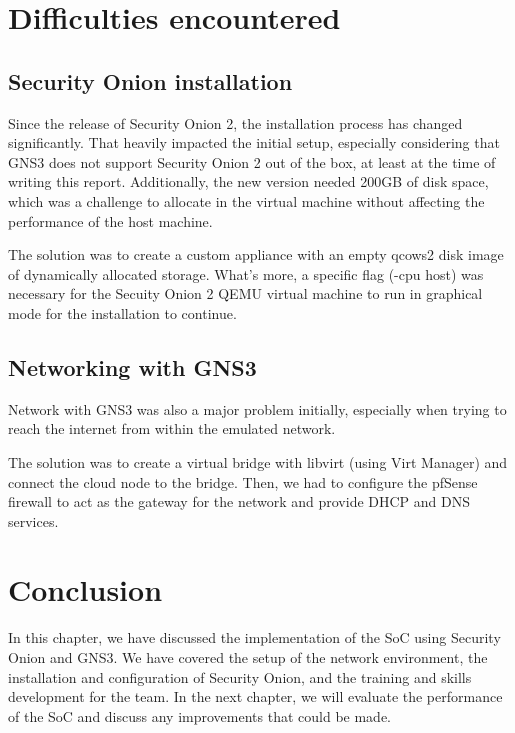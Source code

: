\section{Difficulties encountered}
\subsection{Security Onion installation}
Since the release of Security Onion 2, the installation process has changed significantly.
That heavily impacted the initial setup, especially considering that GNS3 does not support Security Onion 2 out of the box, at least at the time of writing this report.
Additionally, the new version needed 200GB of disk space, which was a challenge to allocate in the virtual machine without affecting the performance of the host machine.

The solution was to create a custom appliance with an empty qcows2 disk image of dynamically allocated storage.
What's more, a specific flag (-cpu host) was necessary for the Secuity Onion 2 QEMU virtual machine to run in graphical mode for the installation to continue.

\subsection{Networking with GNS3}
Network with GNS3 was also a major problem initially, especially when trying to reach the internet from within the emulated network.

The solution was to create a virtual bridge with libvirt (using Virt Manager) and connect the cloud node to the bridge.
Then, we had to configure the pfSense firewall to act as the gateway for the network and provide DHCP and DNS services.

\setcounter{secnumdepth}{0} %
\section{Conclusion}
In this chapter, we have discussed the implementation of the SoC using Security Onion and GNS3.
We have covered the setup of the network environment, the installation and configuration of Security Onion, and the training and skills development for the team.
In the next chapter, we will evaluate the performance of the SoC and discuss any improvements that could be made.
